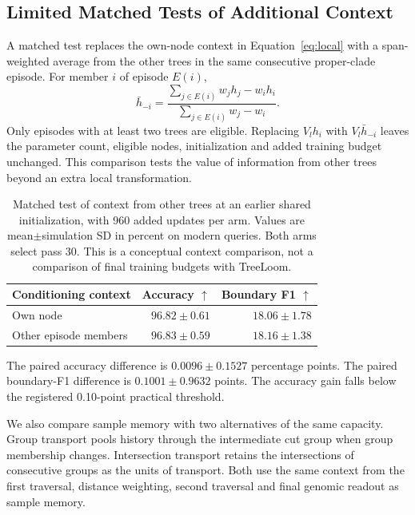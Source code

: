 \documentclass[letterpaper]{article}
\newcommand{\best}[1]{\mathbf{#1}}
\begin{document}
\subsection{Limited Matched Tests of Additional Context}
A matched test replaces the own-node context in Equation~\ref{eq:local} with a span-weighted average from the other trees in the same consecutive proper-clade episode. For member $i$ of episode $E(i)$,
\begin{equation}
\bar h_{-i}=
\frac{\sum_{j\in E(i)}w_jh_j-w_ih_i}
{\sum_{j\in E(i)}w_j-w_i}.
\end{equation}
Only episodes with at least two trees are eligible. Replacing $V_lh_i$ with $V_l\bar h_{-i}$ leaves the parameter count, eligible nodes, initialization and added training budget unchanged. This comparison tests the value of information from other trees beyond an extra local transformation.

\begin{table}[t]
\centering
\small
\begin{tabular}{@{}lrr@{}}
\toprule
Conditioning context & Accuracy $\uparrow$ & Boundary F1 $\uparrow$\\
\midrule
Own node &$96.82\pm0.61$&$18.06\pm1.78$\\
Other episode members &$\best{96.83\pm0.59}$&$\best{18.16\pm1.38}$\\
\bottomrule
\end{tabular}
\caption{Matched test of context from other trees at an earlier shared initialization, with 960 added updates per arm. Values are mean$\pm$simulation SD in percent on modern queries. Both arms select pass 30. This is a conceptual context comparison, not a comparison of final training budgets with TreeLoom.}
\label{tab:episode}
\end{table}

The paired accuracy difference is $0.0096\pm0.1527$ percentage points. The paired boundary-F1 difference is $0.1001\pm0.9632$ points. The accuracy gain falls below the registered 0.10-point practical threshold.

We also compare sample memory with two alternatives of the same capacity. Group transport pools history through the intermediate cut group when group membership changes. Intersection transport retains the intersections of consecutive groups as the units of transport. Both use the same context from the first traversal, distance weighting, second traversal and final genomic readout as sample memory.
\end{document}
